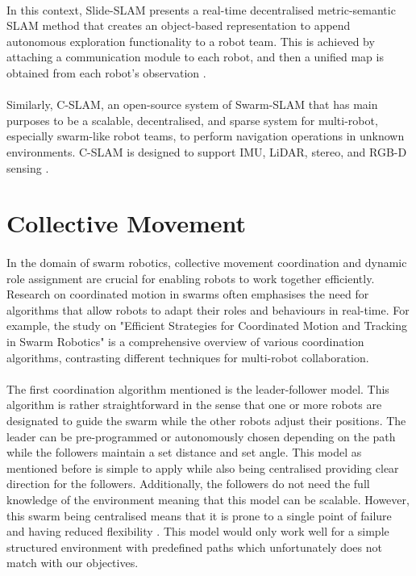 \paragraph*{}
In this context, Slide-SLAM presents a real-time decentralised metric-semantic SLAM method that creates an object-based representation to append autonomous exploration functionality to a robot team. This is achieved by attaching a communication module to each robot, and then a unified map is obtained from each robot’s observation \cite{liu2024slideslam}.

\paragraph*{}
Similarly, C-SLAM, an open-source system of Swarm-SLAM that has main purposes to be a scalable, decentralised, and sparse system for multi-robot, especially swarm-like robot teams, to perform navigation operations in unknown environments. C-SLAM is designed to support IMU, LiDAR, stereo, and RGB-D sensing \cite{lajoie2024swarm}.

\section{Collective Movement}

\paragraph*{}
In the domain of swarm robotics, collective movement coordination and dynamic role assignment are crucial for enabling robots to work together efficiently. Research on coordinated motion in swarms often emphasises the need for algorithms that allow robots to adapt their roles and behaviours in real-time. For example, the study on "Efficient Strategies for Coordinated Motion and Tracking in Swarm Robotics" is a comprehensive overview of various coordination algorithms, contrasting different techniques for multi-robot collaboration. 

\paragraph*{}
The first coordination algorithm mentioned is the leader-follower model. This algorithm is rather straightforward in the sense that one or more robots are designated to guide the swarm while the other robots adjust their positions. The leader can be pre-programmed or autonomously chosen depending on the path while the followers maintain a set distance and set angle. This model as mentioned before is simple to apply while also being centralised providing clear direction for the followers. Additionally, the followers do not need the full knowledge of the environment meaning that this model can be scalable. However, this swarm being centralised means that it is prone to a single point of failure and having reduced flexibility \cite{mehta2024robust}. This model would only work well for a simple structured environment with predefined paths which unfortunately does not match with our objectives.

